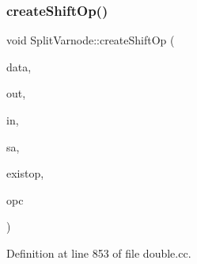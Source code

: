 \subsubsection{\texorpdfstring{createShiftOp()}{createShiftOp()}}
{\footnotesize\ttfamily void Split\+Varnode\+::create\+Shift\+Op (\begin{DoxyParamCaption}\item[{\mbox{\hyperlink{class_funcdata}{Funcdata}} \&}]{data,  }\item[{\mbox{\hyperlink{class_split_varnode}{Split\+Varnode}} \&}]{out,  }\item[{\mbox{\hyperlink{class_split_varnode}{Split\+Varnode}} \&}]{in,  }\item[{\mbox{\hyperlink{class_varnode}{Varnode}} $\ast$}]{sa,  }\item[{\mbox{\hyperlink{class_pcode_op}{Pcode\+Op}} $\ast$}]{existop,  }\item[{\mbox{\hyperlink{opcodes_8hh_abeb7dfb0e9e2b3114e240a405d046ea7}{Op\+Code}}}]{opc }\end{DoxyParamCaption})\hspace{0.3cm}{\ttfamily [static]}}



Definition at line 853 of file double.\+cc.

